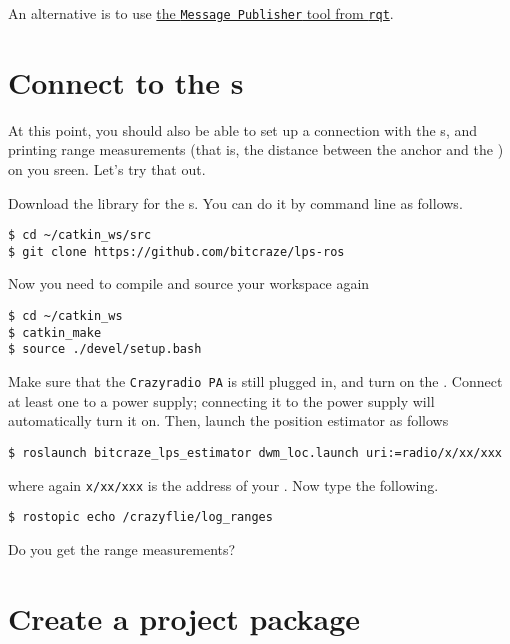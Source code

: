 An alternative is to use \href{http://wiki.ros.org/rqt_publisher}{the \texttt{Message Publisher} tool from \texttt{rqt}}.






\section*{Connect to the \LPN{}s}

At this point, you should also be able to set up a connection with the \LPN{}s, and printing range measurements (that is, the distance between the anchor and the \CF{}) on you sreen.
Let's try that out.

Download the \ROS{} library for the \LPN{}s.
You can do it by command line as follows.

\begin{Verbatim}[fontsize=\small]
$ cd ~/catkin_ws/src
$ git clone https://github.com/bitcraze/lps-ros
\end{Verbatim}

Now you need to compile and source your workspace again

\begin{Verbatim}[fontsize=\small]
$ cd ~/catkin_ws
$ catkin_make
$ source ./devel/setup.bash
\end{Verbatim}

Make sure that the \texttt{Crazyradio PA} is still plugged in, and turn on the \CF{}.
Connect at least one \LPN{} to a power supply; connecting it to the power supply will automatically turn it on.
Then, launch the position estimator as follows

\begin{Verbatim}[fontsize=\small]
$ roslaunch bitcraze_lps_estimator dwm_loc.launch uri:=radio/x/xx/xxx
\end{Verbatim}

where again \verb|x/xx/xxx| is the address of your \CF{}.
Now type the following.

\begin{Verbatim}[fontsize=\small]
$ rostopic echo /crazyflie/log_ranges
\end{Verbatim}

Do you get the range measurements?




\section*{Create a project package}

